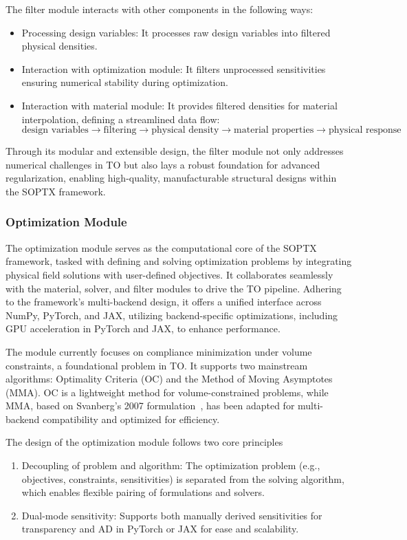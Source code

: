 \documentclass[mathpazo]{cicp}
\begin{document}
The filter module interacts with other components in the following ways:
\begin{itemize}
	\item Processing design variables: It processes raw design variables into filtered physical densities.
	\item Interaction with optimization module: It filters unprocessed sensitivities ensuring numerical stability during optimization.
	\item Interaction with material module: It provides filtered densities for material interpolation, defining a streamlined data flow:
	\begin{equation*}
		\text{design variables} \to \text{filtering} \to \text{physical density} \to \text{material properties} \to \text{physical response}
	\end{equation*}
\end{itemize}

Through its modular and extensible design, the filter module not only addresses numerical challenges in TO but also lays a robust foundation for advanced regularization, enabling high-quality, manufacturable structural designs within the SOPTX framework.

\subsubsection{Optimization Module}
The optimization module serves as the computational core of the SOPTX framework, tasked with defining and solving optimization problems by integrating physical field solutions with user-defined objectives. It collaborates seamlessly with the material, solver, and filter modules to drive the TO pipeline. Adhering to the framework’s multi-backend design, it offers a unified interface across NumPy, PyTorch, and JAX, utilizing backend-specific optimizations, including GPU acceleration in PyTorch and JAX, to enhance performance.

The module currently focuses on compliance minimization under volume constraints, a foundational problem in TO. It supports two mainstream algorithms: Optimality Criteria (OC) and the Method of Moving Asymptotes (MMA). OC is a lightweight method for volume-constrained problems, while MMA, based on Svanberg’s 2007 formulation~\cite{Svanberg2007MmaAG}, has been adapted for multi-backend compatibility and optimized for efficiency.

The design of the optimization module follows two core principles
\begin{enumerate}
	\item Decoupling of problem and algorithm: The optimization problem (e.g., objectives, constraints, sensitivities) is separated from the solving algorithm, which enables flexible pairing of formulations and solvers.
	\item Dual-mode sensitivity: Supports both manually derived sensitivities for transparency and AD in PyTorch or JAX for ease and scalability.
\end{enumerate}
\end{document}
